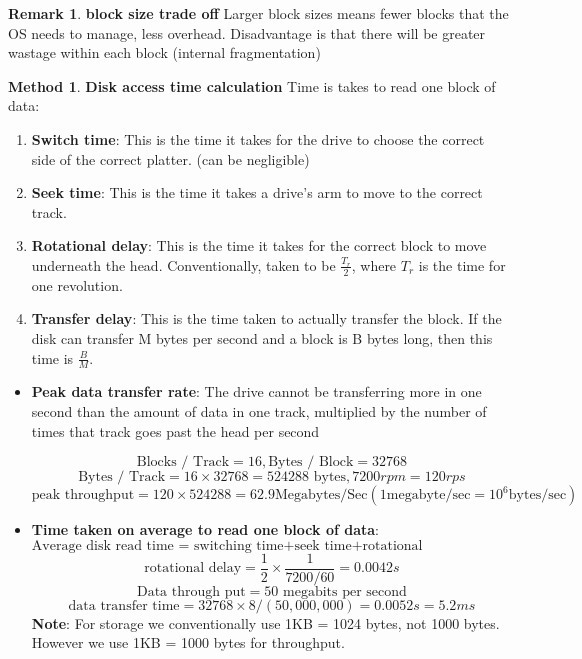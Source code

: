 \documentclass[11pt,a4paper]{article}
\theoremstyle{definition}
\newtheorem*{remark}{Remark}
\newtheorem{method}{Method}[section]
\newenvironment{myitemize}
{ \begin{itemize}
    \setlength{\itemsep}{5pt}
    \setlength{\parskip}{0pt}
    \setlength{\parsep}{0pt}     }
{ \end{itemize}                  }
\newenvironment{myenumerate}
{ \begin{enumerate}
    \setlength{\itemsep}{5pt}
    \setlength{\parskip}{0pt}
    \setlength{\parsep}{0pt}     }
{ \end{enumerate}                }
\begin{document}
\begin{remark}{\textbf{block size trade off}}
	Larger block sizes means fewer blocks that the OS needs to manage, less overhead. Disadvantage is that there will be greater wastage within each block (internal fragmentation)
\end{remark}

\begin{method}{\textbf{Disk access time calculation}} Time is takes to read one block of data:

\begin{myenumerate}
	\item \textbf{Switch time}: This is the time it takes for the drive to choose the correct side of the correct platter. (can be negligible)
	\item \textbf{Seek time}: This is the time it takes a drive's arm to move to the correct track.
	\item \textbf{Rotational delay}: This is the time it takes for the correct block to move underneath the head. Conventionally, taken to be $\frac{T_r}{2}$, where $T_r$ is the time for one revolution.
	\item \textbf{Transfer delay}: This is the time taken to actually transfer the block. If the disk can transfer M bytes per second and a block is B bytes long, then this time is $\frac{B}{M}$.
\end{myenumerate}

\begin{myitemize}
	\item \textbf{Peak data transfer rate}: The drive cannot be transferring more in one second than the amount of data in one track, multiplied by the number of times that track goes past the head per second
	
	\[ \text{Blocks / Track} = 16, \text{Bytes / Block} = 32768 \]
	\[\text{Bytes / Track} = 16 \times 32768=524288 \text{ bytes},  7200rpm=120rps \]
	\[\text{peak throughput}= 120 \times 524288= 62.9 \text{Megabytes/Sec} (1 \text{megabyte/sec} = 10^6 \text{bytes/sec}) \]
	
	\item \textbf{Time taken on average to read one block of data}:
	\[ \text{Average disk read time =  switching time+seek time+rotational delay+transfer time}\]
	\[\text{rotational delay}=\frac{1}{2} \times \frac{1}{7200/60}=0.0042s \]
	\[\text{Data through put} = 50 \text{ megabits per second} \]
	\[\text{data transfer time}=32768\times 8 / (50,000,000)= 0.0052s = 5.2ms \]
	\textbf{Note}: For storage we conventionally use 1KB = 1024 bytes, not 1000 bytes. However we use 1KB = 1000 bytes for throughput.
\end{myitemize}

\end{method}




\end{document}
